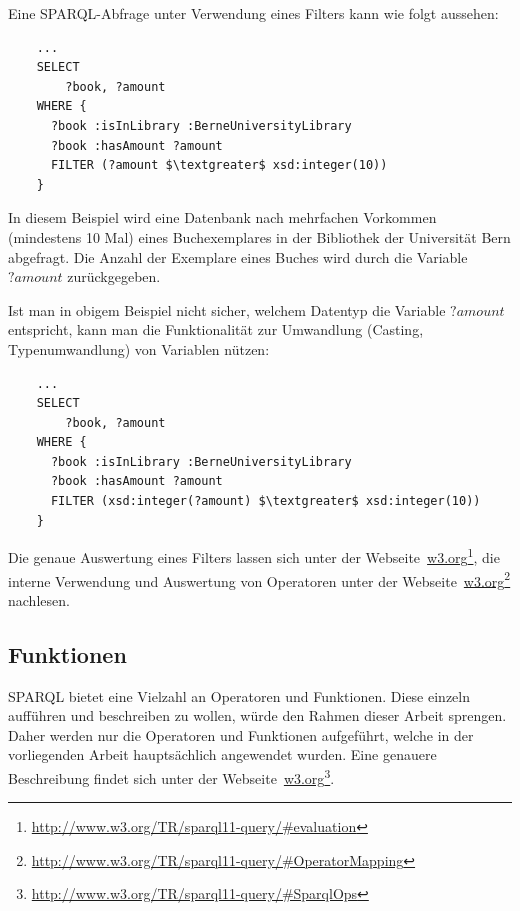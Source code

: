 Eine SPARQL-Abfrage unter Verwendung eines Filters kann wie folgt aussehen:
\begin{lstlisting}
    ...
    SELECT
        ?book, ?amount
    WHERE {
      ?book :isInLibrary :BerneUniversityLibrary
      ?book :hasAmount ?amount
      FILTER (?amount $\textgreater$ xsd:integer(10))
    }
\end{lstlisting}
In diesem Beispiel wird eine Datenbank nach mehrfachen Vorkommen (mindestens 10 Mal) eines Buchexemplares in der Bibliothek der Universität Bern abgefragt. Die Anzahl der Exemplare eines Buches wird durch die Variable $?amount$ zurückgegeben.

Ist man in obigem Beispiel nicht sicher, welchem Datentyp die Variable $?amount$ entspricht, kann man die Funktionalität zur Umwandlung (Casting, Typenumwandlung) von Variablen nützen:
\begin{lstlisting}
    ...
    SELECT
        ?book, ?amount
    WHERE {
      ?book :isInLibrary :BerneUniversityLibrary
      ?book :hasAmount ?amount
      FILTER (xsd:integer(?amount) $\textgreater$ xsd:integer(10))
    }
\end{lstlisting}

Die genaue Auswertung eines Filters lassen sich unter der Webseite~\href{http://www.w3.org/TR/sparql11-query/\#evaluation}{w3.org}\footnote{\url{http://www.w3.org/TR/sparql11-query/\#evaluation}}, die interne Verwendung und Auswertung von Operatoren unter der Webseite~\href{http://www.w3.org/TR/sparql11-query/\#OperatorMapping}{w3.org}\footnote{\url{http://www.w3.org/TR/sparql11-query/\#OperatorMapping}} nachlesen.

\subsection{Funktionen}
\label{subsec:sparql_ausdruecke_funktionen}

SPARQL bietet eine Vielzahl an Operatoren und Funktionen. Diese einzeln aufführen und beschreiben zu wollen, würde den Rahmen dieser Arbeit sprengen. Daher werden nur die Operatoren und Funktionen aufgeführt, welche in der vorliegenden Arbeit hauptsächlich angewendet wurden. Eine genauere Beschreibung findet sich unter der Webseite~\href{http://www.w3.org/TR/sparql11-query/\#SparqlOps}{w3.org}\footnote{\url{http://www.w3.org/TR/sparql11-query/\#SparqlOps}}.

